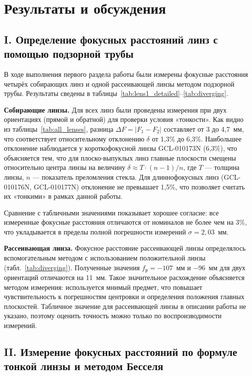\documentclass[a4paper]{article}
\begin{document}
\section{Результаты и обсуждения}

\subsection{I. Определение фокусных расстояний линз с помощью подзорной трубы}

В ходе выполнения первого раздела работы были измерены фокусные расстояния четырёх собирающих линз и одной рассеивающей линзы методом подзорной трубы. Результаты сведены в таблицы~\ref{tab:lens1_detailed}--\ref{tab:diverging}.

\textbf{Собирающие линзы.} Для всех линз были проведены измерения при двух ориентациях (прямой и обратной) для проверки условия «тонкости». Как видно из таблицы~\ref{tab:all_lenses}, разница $\Delta F = |F_1 - F_2|$ составляет от 3 до 4,7~мм, что соответствует относительному отклонению $\delta$ от 1,3\% до 6,3\%. Наибольшее отклонение наблюдается у короткофокусной линзы GCL-010173N (6,3\%), что объясняется тем, что для плоско-выпуклых линз главные плоскости смещены относительно центра линзы на величину $\delta \approx T \cdot (n-1)/n$, где $T$ — толщина линзы, $n$ — показатель преломления стекла. Для длиннофокусных линз (GCL-010176N, GCL-010177N) отклонение не превышает 1,5\%, что позволяет считать их «тонкими» в рамках данной работы.

Сравнение с табличными значениями показывает хорошее согласие: все измеренные фокусные расстояния отличаются от номиналов не более чем на 3\%, что укладывается в пределы полной погрешности измерений $\sigma = 2{,}03$~мм.

\textbf{Рассеивающая линза.} Фокусное расстояние рассеивающей линзы определялось вспомогательным методом с использованием положительной линзы (табл.~\ref{tab:diverging}). Полученные значения $f_\text{р} = -107$~мм и $-96$~мм для двух ориентаций отличаются на 11~мм. Такое значительное расхождение объясняется методом измерения: используется мнимый предмет, что повышает чувствительность к погрешностям центровки и определения положения главных плоскостей. Табличное значение для рассеивающей линзы в описании работы не указано, поэтому оценить точность можно только по воспроизводимости измерений.

\subsection{II. Измерение фокусных расстояний по формуле тонкой линзы и методом Бесселя}
\end{document}
